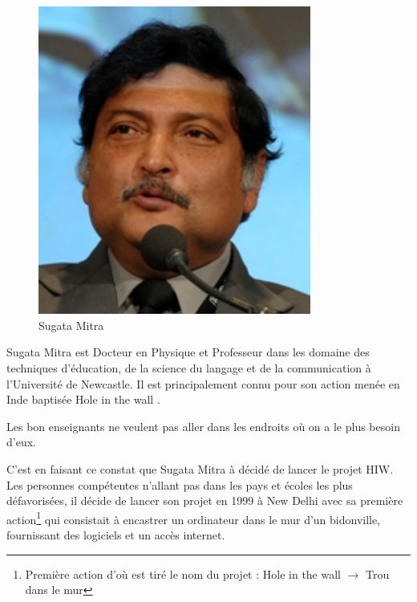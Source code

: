 \begin{minipage}[H]{0.3\linewidth}
  \begin{figure}[H]
  \centering
  \includegraphics[width=0.8\textwidth]{../resources/illustrations/sugatamitra}
  \caption{\mbox{Sugata} \mbox{Mitra}}
  \end{figure}
\end{minipage}
\begin{minipage}[H]{0.7\linewidth}
Sugata Mitra est Docteur en Physique et Professeur dans les domaine des techniques d'éducation, de la science du langage et de la communication à l'Université de Newcastle. Il est principalement connu pour son action menée en Inde baptisée \og Hole in the wall \fg{}\cite{wikipedia_sugata_mitra}.
\vspace{.8cm}
\end{minipage}

\begin{coolquote}
  Les bon enseignants ne veulent pas aller dans les endroits où on a le plus besoin d'eux.
\end{coolquote}

C'est en faisant ce constat que Sugata Mitra à décidé de lancer le projet \gls{HIW}. Les personnes compétentes n'allant pas dans les pays et écoles les plus défavorisées, il décide de lancer son projet en 1999 à New Delhi avec sa première action\footnote{Première action d'où est tiré le nom du projet : \og Hole in the wall \fg{} $\rightarrow$ \og Trou dans le mur \fg{}} qui consistait à encastrer un ordinateur dans le mur d'un bidonville, fournissant des logiciels et un accès internet\cite{ted_mitra_1,ted_mitra_2}.

